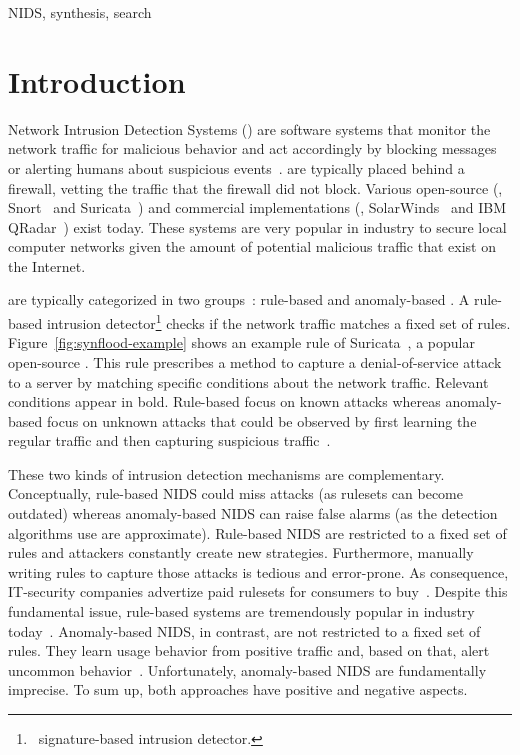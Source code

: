 \documentclass[conference]{IEEEtran}
\begin{document}
\begin{IEEEkeywords}
NIDS, synthesis, search
\end{IEEEkeywords}

\section{Introduction}

Network Intrusion Detection Systems (\nids{}) are software systems
that monitor the network traffic for malicious behavior and act
accordingly by blocking messages or alerting humans about suspicious
events~\cite{Mitchell:2014:SID:2597757.2542049}. \nids{} are typically
placed behind a firewall, vetting the traffic that the firewall did
not block. Various open-source (\eg{}, Snort~\cite{snort} and
Suricata~\cite{suricata}) and commercial implementations (\eg{},
SolarWinds~\cite{solarwinds} and IBM QRadar~\cite{qradar}) exist
today. These systems are very popular in industry to secure local
computer networks given the amount of potential malicious traffic that
exist on the Internet.

\sloppy \nids{} are typically categorized in two
groups~\cite{kumar2007survey}: rule-based and anomaly-based \nids. A
rule-based intrusion detector\footnote{\aka\ signature-based intrusion
  detector.} checks if the network traffic matches a fixed set of
rules. Figure~\ref{fig:synflood-example} shows an example rule of
Suricata~\cite{suricata}, a popular open-source \nids{}. This rule
prescribes a method to capture a denial-of-service
attack~\cite{understanding-dos} to a server by matching specific
conditions about the network traffic. Relevant conditions appear in
bold. Rule-based \nids{} focus on known attacks whereas anomaly-based
\nids{} focus on unknown attacks that could be observed by first
learning the regular traffic and then capturing suspicious
traffic~\cite{kumar2007survey,Mitchell:2014:SID:2597757.2542049,cordy-etal-issta19}.

These two kinds of intrusion detection mechanisms are
complementary. Conceptually, rule-based NIDS could miss attacks (as
rulesets can become outdated) whereas anomaly-based NIDS can raise
false alarms (as the detection algorithms use are approximate).
Rule-based NIDS are restricted to a fixed set of rules and attackers
constantly create new strategies. Furthermore, manually writing rules
to capture those attacks is tedious and error-prone. As consequence,
IT-security companies advertize paid rulesets for consumers to
buy~\cite{proofpoint-etpro,snort-rule-subscriptions}.  Despite this
fundamental issue, rule-based systems are tremendously popular in
industry today~. Anomaly-based NIDS, in contrast, are not
restricted to a fixed set of rules. They learn usage behavior from
positive traffic and, based on that, alert uncommon
behavior~\cite{7579764}. Unfortunately, anomaly-based NIDS are
fundamentally imprecise. To sum up, both approaches have positive and
negative aspects.
\end{document}
